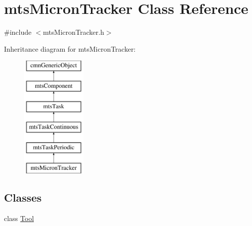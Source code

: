 \hypertarget{classmts_micron_tracker}{\section{mts\-Micron\-Tracker Class Reference}
\label{classmts_micron_tracker}
}


{\ttfamily \#include $<$mts\-Micron\-Tracker.\-h$>$}

Inheritance diagram for mts\-Micron\-Tracker\-:\begin{figure}[H]
\begin{center}
\leavevmode
\includegraphics[height=6.000000cm]{d5/d86/classmts_micron_tracker}
\end{center}
\end{figure}
\subsection*{Classes}
\begin{DoxyCompactItemize}
\item 
class \hyperlink{classmts_micron_tracker_1_1_tool}{Tool}
\end{DoxyCompactItemize}
